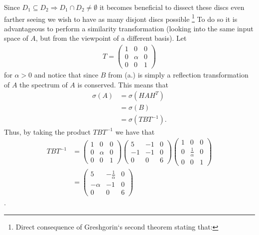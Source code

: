 \documentclass[12pt,
               a4paper,
               article,
               oneside,
               english,oldfontcommands]{memoir}
\begin{document}
Since $D_1 \subseteq D_2 \Rightarrow D_1 \cap D_2 \neq \emptyset$ it becomes beneficial to dissect these discs even farther seeing we wish to have as many disjont discs possible \footnote{Direct consequence of Greshgorin`s second theorem stating that: } To do so it is advantageous to perform a similarity transformation (looking into the same input space of $A$, but from the viewpoint of a different basis). Let
\begin{align*}
T = \begin{pmatrix}
1 & 0 & 0 \\[5pt]
0 & \alpha & 0 \\[5pt]
0 & 0 & 1
\end{pmatrix}
\end{align*}
for $\alpha > 0$ and notice that since $B$ from (a.) is simply a reflection transformation of $A$ the spectrum of $A$ is conserved. This means that 
\begin{align*}
\sigma(A) &=\sigma(HAH^T) \\[5pt]
&=\sigma(B) \\[5pt]
&= \sigma(T B T^{-1}).
\end{align*}
Thus, by taking the product $TBT^{-1}$ we have that 
\begin{align*}
TBT^{-1} &= \begin{pmatrix}
1 & 0 & 0 \\[5pt]
0 & \alpha & 0 \\[5pt]
0 & 0 & 1
\end{pmatrix}
\begin{pmatrix}
5 & -1 & 0 \\[5pt]
-1 & -1 & 0\\[5pt]
0 & 0 & 6
\end{pmatrix}
\begin{pmatrix}
1 & 0 & 0 \\[5pt]
0 & \frac{1}{\alpha} & 0 \\[5pt]
0 & 0 & 1
\end{pmatrix} \\[10pt]
&= \begin{pmatrix}
5 & -\frac{1}{\alpha}& 0 \\[5pt]
-\alpha & -1 & 0\\[5pt]
0 & 0 & 6
\end{pmatrix}
\end{align*}. 
\end{document}
